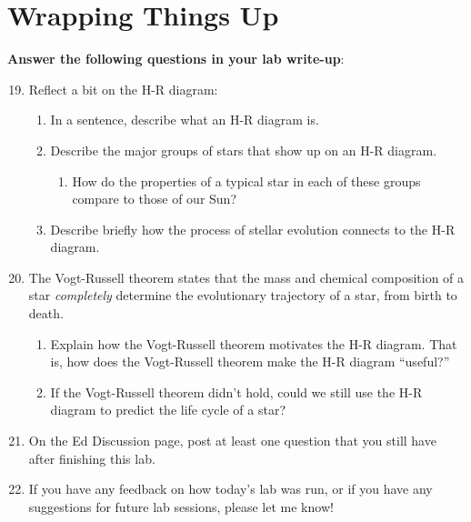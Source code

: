 \documentclass[11pt]{article}
\begin{document}
\section{Wrapping Things Up}
\textbf{Answer the following questions in your lab write-up}:
\begin{enumerate}
\setcounter{enumi}{18}

    \item Reflect a bit on the H-R diagram:
    \begin{enumerate}
        \item In a sentence, describe what an H-R diagram is.
        
        \item Describe the major groups of stars that show up on an H-R diagram. 
        \begin{enumerate}
            \item How do the properties of a typical star in each of these groups compare to those of our Sun?
        \end{enumerate} 
        
        \item Describe briefly how the process of stellar evolution connects to the H-R diagram.
        
    \end{enumerate}
    
    
    \item The Vogt-Russell theorem states that the mass and chemical composition of a star \emph{completely} determine the evolutionary trajectory of a star, from birth to death. 
    \begin{enumerate}
        \item Explain how the Vogt-Russell theorem motivates the H-R diagram. That is, how does the Vogt-Russell theorem make the H-R diagram ``useful?''
        
        \item If the Vogt-Russell theorem didn't hold, could we still use the H-R diagram to predict the life cycle of a star?
    \end{enumerate}
    
    \item On the Ed Discussion page, post at least one question that you still have after finishing this lab.
    
    \item If you have any feedback on how today's lab was run, or if you have any suggestions for future lab sessions, please let me know!
    
    
\end{enumerate}
\end{document}
